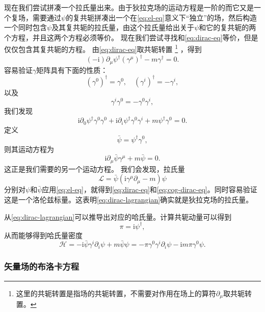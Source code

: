 \documentclass[hyperref, UTF8, a4paper]{ctexart}
\newcommand*{\ii}{\mathrm{i}}
\begin{document}
现在我们尝试拼凑一个拉氏量出来。由于狄拉克场的运动方程是一阶的而它又是一个复场，需要通过$\psi$的复共轭拼凑出一个在\eqref{eq:el-eq}意义下“独立”的场，然后构造一个同时包含$\psi$及其复共轭的拉氏量，由这个拉氏量给出关于$\psi$和它的复共轭的两个方程，并且这两个方程必须等价。
现在我们尝试寻找和\eqref{eq:dirac-eq}等价，但是仅仅包含其复共轭的方程。
由\eqref{eq:dirac-eq}取共轭转置%
\footnote{这里的共轭转置是指场的共轭转置，不需要对作用在场上的算符$\partial_\mu$取共轭转置。}
，得到
\[
    (-\ii) \partial_\mu \psi^\dagger (\gamma^\mu)^\dagger - m \gamma^\dagger = 0.
\]
容易验证$\gamma$矩阵具有下面的性质：
\[
    (\gamma^0)^\dagger = \gamma^0, \quad (\gamma^i)^\dagger = - \gamma^i, 
\]
以及
\[
    \gamma^i \gamma^0 = - \gamma^0 \gamma^i,
\]
我们发现
\[
    \ii \partial_0 \psi^\dagger \gamma^0 \gamma^0 + \ii \partial_i \psi^\dagger \gamma^0 \gamma^i + m \psi^\dagger \gamma^0 = 0.
\]
定义
\begin{equation}
    \bar{\psi} = \psi^\dagger \gamma^0,
\end{equation}
则其运动方程为
\begin{equation}
    \ii \partial_\mu \bar{\psi} \gamma^\mu + m \bar{\psi} = 0.
    \label{eq:cog-dirac-eq}
\end{equation}
这正是我们需要的另一个运动方程。
我们会发现，拉氏量
\begin{equation}
    \mathcal{L} = \bar{\psi} (\ii \gamma^\mu \partial_\mu - m) \psi
    \label{eq:dirac-lagrangian}
\end{equation}
分别对$\psi$和$\bar{\psi}$应用\eqref{eq:el-eq}，就得到\eqref{eq:dirac-eq}和\eqref{eq:cog-dirac-eq}。同时容易验证这是一个洛伦兹标量。这表明\eqref{eq:dirac-lagrangian}确实就是狄拉克场的拉氏量。

从\eqref{eq:dirac-lagrangian}可以推导出对应的哈氏量。计算共轭动量可以得到
\begin{equation}
    \pi = \ii \psi^\dagger,
\end{equation}
从而能够得到哈氏量密度
\begin{equation}
    \mathcal{H} = - \ii \bar{\psi} \gamma^i \partial_i \psi  + m \bar{\psi} \psi = - \pi \gamma^0 \gamma^i \partial_i \psi - \ii m \pi \gamma^0 \psi.
\end{equation}

\subsubsection{矢量场的布洛卡方程}
\end{document}

